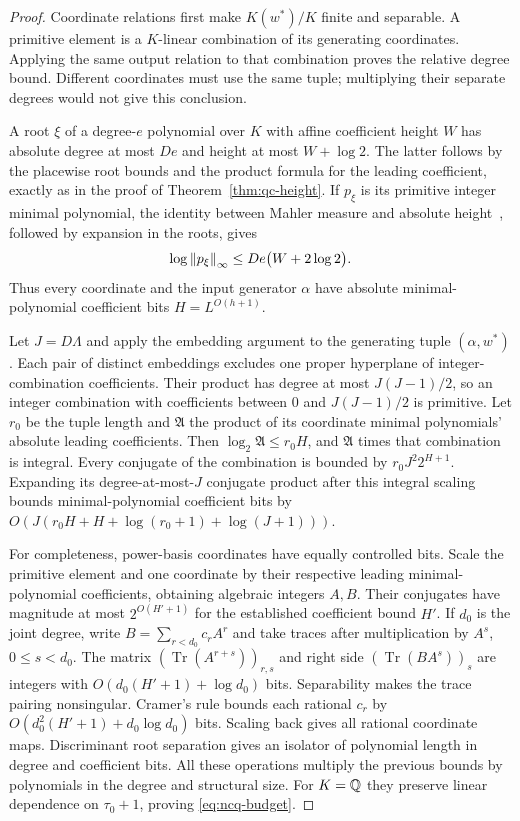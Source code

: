 \begin{proof}
Coordinate relations first make $K(w^*)/K$ finite and separable. A
primitive element is a $K$-linear combination of its generating
coordinates. Applying the same output relation to that combination proves
the relative degree bound. Different coordinates must use the same tuple;
multiplying their separate degrees would not give this conclusion.

A root $\xi$ of a degree-$e$ polynomial over $K$ with affine coefficient
height $W$ has absolute degree at most $De$ and height at most $W+\log2$.
The latter follows by the placewise root bounds and the product formula
for the leading coefficient, exactly as in the proof of
Theorem~\ref{thm:qc-height}. If $p_\xi$ is its primitive integer minimal
polynomial, the identity between Mahler measure and absolute
height~\cite{BombieriGubler2006}, followed by expansion in the roots, gives
\[
 \log\left\lVert p_\xi\right\rVert_\infty
       \le De\bigl(W+2\log2\bigr).
\]
Thus every coordinate and the input generator $\alpha$ have absolute
minimal-polynomial coefficient bits $H=L^{O(h+1)}$.

Let $J=D\Lambda$ and apply the embedding argument to the generating tuple
$(\alpha,w^*)$. Each pair of distinct embeddings excludes one proper
hyperplane of integer-combination coefficients. Their product has degree
at most $J(J-1)/2$, so an integer combination with coefficients between
$0$ and $J(J-1)/2$ is primitive. Let $r_0$ be the tuple length and
$\mathfrak A$ the product of its coordinate minimal polynomials'
absolute leading coefficients. Then $\log_2\mathfrak A\le r_0H$,
and $\mathfrak A$ times that combination is integral. Every conjugate
of the combination is bounded by $r_0J^2 2^{H+1}$. Expanding its
degree-at-most-$J$ conjugate product after this integral scaling bounds
minimal-polynomial coefficient bits by
$O(J(r_0H+H+\log(r_0+1)+\log(J+1)))$.

For completeness, power-basis coordinates have equally controlled bits.
Scale the primitive element and one coordinate by their respective leading
minimal-polynomial coefficients, obtaining algebraic integers $A,B$.
Their conjugates have magnitude at most $2^{O(H'+1)}$ for the established
coefficient bound $H'$. If $d_0$ is the joint degree, write
$B=\sum_{r<d_0}c_rA^r$ and take traces after multiplication by
$A^s$, $0\le s<d_0$. The matrix
$(\operatorname{Tr}(A^{r+s}))_{r,s}$ and right side
$(\operatorname{Tr}(BA^s))_s$ are integers with
$O(d_0(H'+1)+\log d_0)$ bits. Separability makes the trace pairing
nonsingular. Cramer's rule bounds each rational $c_r$ by
$O(d_0^2(H'+1)+d_0\log d_0)$ bits. Scaling back gives all rational
coordinate maps. Discriminant root separation gives an isolator of
polynomial length in degree and coefficient bits. All these operations
multiply the previous bounds by polynomials in the degree and structural
size. For $K=\mathbb Q$ they preserve linear dependence on $\tau_0+1$, proving
\eqref{eq:ncq-budget}.
\end{proof}

